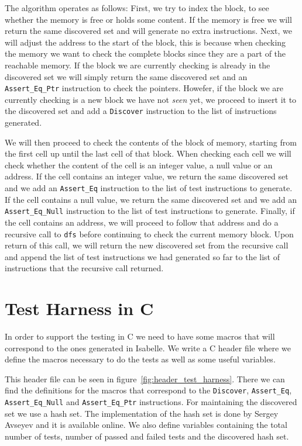 The algorithm operates as follows:
First, we try to index the block, to see whether the memory is free or holds some content.
If the memory is free we will return the same discovered set and will generate no extra instructions.
Next, we will adjust the address to the start of the block, this is because when checking the memory we want to check the complete blocks since they are a part of the reachable memory.
If the block we are currently checking is already in the discovered set we will simply return the same discovered set and an \verb|Assert_Eq_Ptr| instruction to check the pointers.
Howefer, if the block we are currently checking is a new block we have not \textit{seen} yet, we proceed to insert it to the discovered set and add a \verb|Discover| instruction to the list of instructions generated.

We will then proceed to check the contents of the block of memory, starting from the first cell up until the last cell of that block.
When checking each cell we will check whether the content of the cell is an integer value, a null value or an address.
If the cell contains an integer value, we return the same discovered set and we add an \verb|Assert_Eq| instruction to the list of test instructions to generate.
If the cell contains a null value, we return the same discovered set and we add an \verb|Assert_Eq_Null| instruction to the list of test instructions to generate.
Finally, if the cell contains an address, we will proceed to follow that address and do a recursive call to \verb|dfs| before continuing to check the current memory block.
Upon return of this call, we will return the new discovered set from the recursive call and append the list of test instructions we had generated so far to the list of instructions that the recursive call returned.


\section{Test Harness in C}

In order to support the testing in C we need to have some macros that will correspond to the ones generated in Isabelle.
We write a C header file where we define the macros necessary to do the tests as well as some useful variables.

This header file can be seen in figure~\ref{fig:header_test_harness}.
There we can find the definitions for the macros that correspond to the \verb|Discover|, \verb|Assert_Eq|, \verb|Assert_Eq_Null| and \verb|Assert_Eq_Ptr| instructions.
For maintaining the discovered set we use a hash set.
The implementation of the hash set is done by Sergey Avseyev and it is available online\cite{hashset}.
We also define variables containing the total number of tests, number of passed and failed tests and the discovered hash set.


